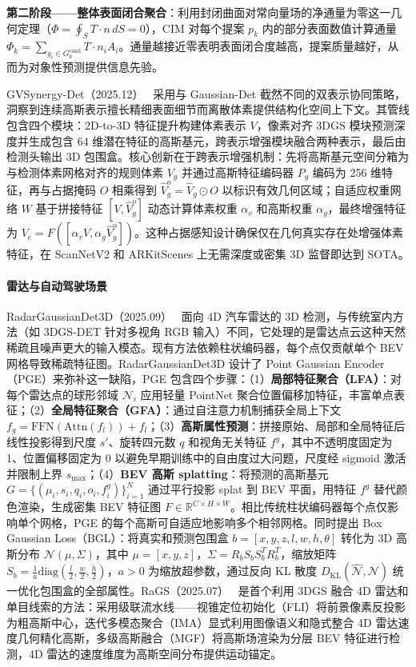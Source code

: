 \textbf{第二阶段——整体表面闭合聚合}：利用封闭曲面对常向量场的净通量为零这一几何定理（$\Phi = \oint_S T \cdot n \, dS = 0$），CIM 对每个提案 $p_k$ 内的部分表面数值计算通量 $\Phi_k = \sum_{g_i \in G^{\text{cand}}_k} T \cdot n_i A_i$。通量越接近零表明表面闭合度越高，提案质量越好，从而为对象性预测提供信息先验。

GVSynergy-Det（2025.12）~\cite{2512_23176} 采用与 Gaussian-Det 截然不同的双表示协同策略，洞察到连续高斯表示擅长精细表面细节而离散体素提供结构化空间上下文。其管线包含四个模块：2D-to-3D 特征提升构建体素表示 $V$，像素对齐 3DGS 模块预测深度并生成包含 64 维潜在特征的高斯基元，跨表示增强模块融合两种表示，最后由检测头输出 3D 包围盒。核心创新在于跨表示增强机制：先将高斯基元空间分箱为与检测体素网格对齐的规则体素 $V_g$ 并通过高斯特征编码器 $P_g$ 编码为 256 维特征，再与占据掩码 $O$ 相乘得到 $\hat{V}_g^o = \hat{V}_g \odot O$ 以标识有效几何区域；自适应权重网络 $W$ 基于拼接特征 $[V, \hat{V}_g^o]$ 动态计算体素权重 $\alpha_v$ 和高斯权重 $\alpha_g$，最终增强特征为 $V_e = F([\alpha_v V, \alpha_g \hat{V}_g^o])$。这种占据感知设计确保仅在几何真实存在处增强体素特征，在 ScanNetV2 和 ARKitScenes 上无需深度或密集 3D 监督即达到 SOTA。

\paragraph{雷达与自动驾驶场景} RadarGaussianDet3D（2025.09）~\cite{2509_16119} 面向 4D 汽车雷达的 3D 检测，与传统室内方法（如 3DGS-DET 针对多视角 RGB 输入）不同，它处理的是雷达点云这种天然稀疏且噪声更大的输入模态。现有方法依赖柱状编码器，每个点仅贡献单个 BEV 网格导致稀疏特征图。RadarGaussianDet3D 设计了 Point Gaussian Encoder（PGE）来弥补这一缺陷，PGE 包含四个步骤：（1）\textbf{局部特征聚合（LFA）}：对每个雷达点的球形邻域 $\mathcal{N}_i$ 应用轻量 PointNet 聚合位置偏移加特征，丰富单点表征；（2）\textbf{全局特征聚合（GFA）}：通过自注意力机制捕获全局上下文 $f_g = \text{FFN}(\text{Attn}(f_l)) + f_l$；（3）\textbf{高斯属性预测}：拼接原始、局部和全局特征后线性投影得到尺度 $s'$、旋转四元数 $q$ 和视角无关特征 $f^g$，其中不透明度固定为 1、位置偏移固定为 0 以避免早期训练中的自由度过大问题，尺度经 sigmoid 激活并限制上界 $s_\text{max}$；（4）\textbf{BEV 高斯 splatting}：将预测的高斯基元 $G = \{(\mu_i, s_i, q_i, o_i, f^g_i)\}_{i=1}^N$ 通过平行投影 splat 到 BEV 平面，用特征 $f^g$ 替代颜色渲染，生成密集 BEV 特征图 $F \in \mathbb{R}^{C \times H \times W}$。相比传统柱状编码器每个点仅影响单个网格，PGE 的每个高斯可自适应地影响多个相邻网格。同时提出 Box Gaussian Loss（BGL）：将真实和预测包围盒 $b = [x, y, z, l, w, h, \theta]$ 转化为 3D 高斯分布 $\mathcal{N}(\mu, \Sigma)$，其中 $\mu = [x,y,z]$，$\Sigma = R_b S_b S_b^T R_b^T$，缩放矩阵 $S_b = \frac{1}{a}\text{diag}(\frac{l}{2}, \frac{w}{2}, \frac{h}{2})$，$a > 0$ 为缩放超参数，通过反向 KL 散度 $D_{\text{KL}}(\hat{\mathcal{N}}, \mathcal{N})$ 统一优化包围盒的全部属性。RaGS（2025.07）~\cite{2507_19856} 是首个利用 3DGS 融合 4D 雷达和单目线索的方法：采用级联流水线——视锥定位初始化（FLI）将前景像素反投影为粗高斯中心，迭代多模态聚合（IMA）显式利用图像语义和隐式整合 4D 雷达速度几何精化高斯，多级高斯融合（MGF）将高斯场渲染为分层 BEV 特征进行检测，4D 雷达的速度维度为高斯空间分布提供运动锚定。

